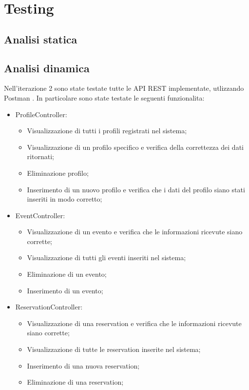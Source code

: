 \section{Testing}
\subsection{Analisi statica}
\subsection{Analisi dinamica}
Nell’iterazione 2 sono state testate tutte le API REST implementate, utlizzando Postman .
In particolare sono state testate le seguenti funzionalita:

\begin{itemize}
	\item ProfileController:
	\begin{itemize}
		\item Visualizzazione di tutti i profili registrati nel sistema;
		\item Visualizzazione di un profilo specifico e verifica della correttezza dei dati ritornati;
		\item Eliminazione profilo;
		\item Inserimento di un nuovo profilo e verifica che i dati del profilo siano stati inseriti in modo corretto;
	\end{itemize}
	\item EventController:
	\begin{itemize}
		\item Visualizzazione di un evento e verifica che le informazioni ricevute siano corrette;
		\item Visualizzazione di tutti gli eventi inseriti nel sistema;
		\item Eliminazione di un evento;
		\item Inserimento di un evento;
	\end{itemize}
	\item ReservationController:
	\begin{itemize}
		\item Visualizzazione di una reservation e verifica che le informazioni ricevute siano corrette;
		\item Visualizzazione di tutte le reservation inserite nel sistema;
		\item Inserimento di una nuova reservation;
		\item Eliminazione di una reservation;
	\end{itemize}

\end{itemize}

